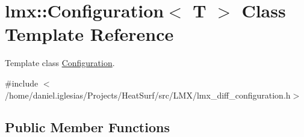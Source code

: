 \hypertarget{classlmx_1_1Configuration}{\section{lmx\-:\-:Configuration$<$ T $>$ Class Template Reference}
\label{classlmx_1_1Configuration}
}


Template class \hyperlink{classlmx_1_1Configuration}{Configuration}.  




{\ttfamily \#include $<$/home/daniel.\-iglesias/\-Projects/\-Heat\-Surf/src/\-L\-M\-X/lmx\-\_\-diff\-\_\-configuration.\-h$>$}

\subsection*{Public Member Functions}
